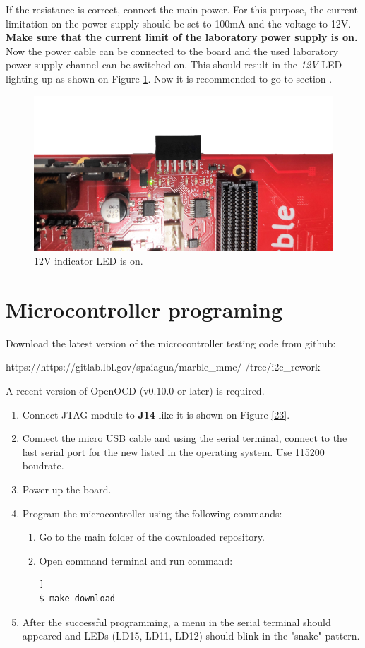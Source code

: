 \documentclass[12pt,oneside,a4]{article}
\begin{document}
If the resistance is correct, connect the main power. For this purpose, the current limitation on the power supply should be set to 100mA and the voltage to 12V. \textbf{Make sure that the current limit of the laboratory power supply is on.} Now the power cable can be connected to the board and the used laboratory power supply channel can be switched on.
This should result in the \textit{12V} LED lighting up as shown  on Figure \ref{02}. Now it is recommended to go to section .
\begin{figure}[H]
\begin{center}
\includegraphics[width=0.8\linewidth, angle = 180]{xrpoff.png}
 \caption{12V indicator LED is on. }\label{02}
\end{center}
\end{figure}

\section{Microcontroller programing}
\label{microcontroller}

Download the latest version of the microcontroller testing code from github:
\begin{leftbar}
https://https://gitlab.lbl.gov/spaiagua/marble\_mmc/-/tree/i2c\_rework
\end{leftbar}

A recent version of OpenOCD (v0.10.0 or later) is required.
\begin{enumerate}
	\item Connect JTAG module to \textbf{J14} like it is shown on Figure \ref{23}.
	\item Connect the micro USB cable and using the serial terminal, connect to the last serial port for the new listed in the operating system. Use 115200 boudrate.
	\item Power up the board.
	\item Program the microcontroller using the following commands:
	\begin{enumerate}
	\item Go to the main folder of the downloaded repository.
	\item Open command terminal and run command:
	\begin{lstlisting}[backgroundcolor = \color{Gainsboro}, language=bash, frame=none]]
$ make download
	\end{lstlisting}
	\end{enumerate}
	\item After the successful programming, a menu in the serial terminal should appeared and LEDs (LD15, LD11, LD12) should blink in the "snake" pattern.
\end{enumerate}
\end{document}
